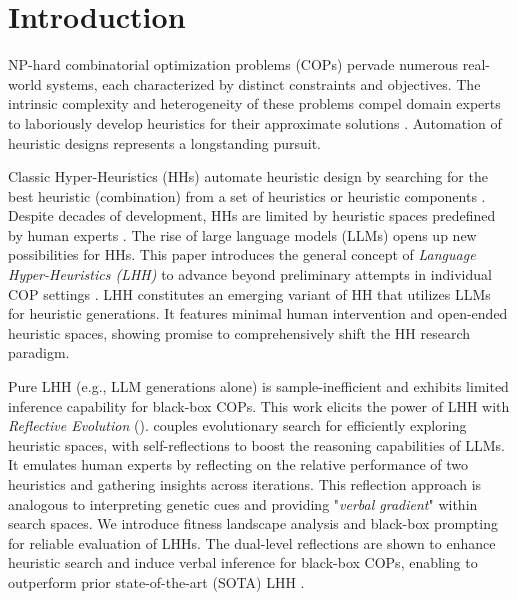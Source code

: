 
\section{Introduction}\label{sec: introduction}
NP-hard combinatorial optimization problems (COPs) pervade numerous real-world systems, each characterized by distinct constraints and objectives. The intrinsic complexity and heterogeneity of these problems compel domain experts to laboriously develop heuristics for their approximate solutions \cite{hromkovivc2013algorithmics_for_hard_problems}. Automation of heuristic designs represents a longstanding pursuit.

Classic Hyper-Heuristics (HHs) automate heuristic design by searching for the best heuristic (combination) from a set of heuristics or heuristic components \cite{pillay2018hh_book}. Despite decades of development, HHs are limited by heuristic spaces predefined by human experts \cite{pillay2018hh_book}. The rise of large language models (LLMs) opens up new possibilities for HHs. This paper introduces the general concept of \textit{Language Hyper-Heuristics (LHH)} to advance beyond preliminary attempts in individual COP settings \cite{romera2023funsearch, liu2023algorithm_evolution}. LHH constitutes an emerging variant of HH that utilizes LLMs for heuristic generations. It features minimal human intervention and open-ended heuristic spaces, showing promise to comprehensively shift the HH research paradigm.

Pure LHH (e.g., LLM generations alone) is sample-inefficient and exhibits limited inference capability for black-box COPs. This work elicits the power of LHH with \textit{Reflective Evolution} (\our{}). \our{} couples evolutionary search for efficiently exploring heuristic spaces, with self-reflections to boost the reasoning capabilities of LLMs. It emulates human experts by reflecting on the relative performance of two heuristics and gathering insights across iterations. 
This reflection approach is analogous to interpreting genetic cues and providing "\textit{verbal gradient}" within search spaces.
We introduce fitness landscape analysis and black-box prompting for reliable evaluation of LHHs. The dual-level reflections are shown to enhance heuristic search and induce verbal inference for black-box COPs, enabling \our{} to outperform prior state-of-the-art (SOTA) LHH \cite{liu2024_llm_gls}.

